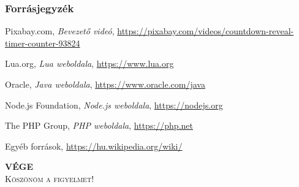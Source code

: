 \documentclass[10pt]{beamer}
\begin{document}
	\begin{frame}
		\frametitle{Forrásjegyzék}

		\begin{thebibliography}{9}
			 Pixabay.com, \emph{Bevezető videó},
				\url{https://pixabay.com/videos/countdown-reveal-timer-counter-93824}		
		
			 Lua.org, \emph{Lua weboldala},
				\url{https://www.lua.org}

			 Oracle, \emph{Java weboldala},
				\url{https://www.oracle.com/java}

			 Node.js Foundation, \emph{Node.js weboldala},
				\url{https://nodejs.org}
				
			 The PHP Group, \emph{PHP weboldala},
				\url{https://php.net}
				
			 Egyéb források,
				\url{https://hu.wikipedia.org/wiki/}
		\end{thebibliography}
	\end{frame}
	
	\begin{frame}
		\begin{center}
			\textbf{\huge{VÉGE}} \\
			\textsc{ \large{ Köszönöm a figyelmet! } }
		\end{center}
	\end{frame}
\end{document}
